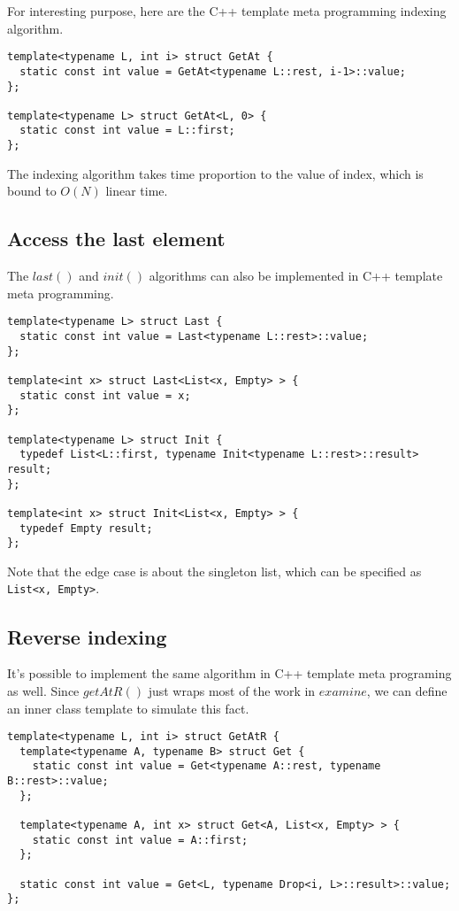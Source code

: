 \documentclass{article}
\begin{document}
For interesting purpose, here are the C++ template meta programming indexing algorithm.

\lstset{language=C++}
\begin{lstlisting}
template<typename L, int i> struct GetAt {
  static const int value = GetAt<typename L::rest, i-1>::value;
};

template<typename L> struct GetAt<L, 0> {
  static const int value = L::first;
};
\end{lstlisting}

The indexing algorithm takes time proportion to the value of index, which is bound to $O(N)$
linear time.

\subsection{Access the last element}

The $last()$ and $init()$ algorithms can also be implemented in C++ template meta programming.

\lstset{language=C++}
\begin{lstlisting}
template<typename L> struct Last {
  static const int value = Last<typename L::rest>::value;
};

template<int x> struct Last<List<x, Empty> > {
  static const int value = x;
};

template<typename L> struct Init {
  typedef List<L::first, typename Init<typename L::rest>::result> result;
};

template<int x> struct Init<List<x, Empty> > {
  typedef Empty result;
};
\end{lstlisting}

Note that the edge case is about the singleton list, which can be specified as \verb|List<x, Empty>|.

\subsection{Reverse indexing}
It's possible to implement the same algorithm in C++ template meta programing as well.
Since $getAtR()$ just wraps most of the work in $examine$, we can define an inner
class template to simulate this fact.

\lstset{language=C++}
\begin{lstlisting}
template<typename L, int i> struct GetAtR {
  template<typename A, typename B> struct Get {
    static const int value = Get<typename A::rest, typename B::rest>::value;
  };

  template<typename A, int x> struct Get<A, List<x, Empty> > {
    static const int value = A::first;
  };

  static const int value = Get<L, typename Drop<i, L>::result>::value;
};
\end{lstlisting}
\end{document}
